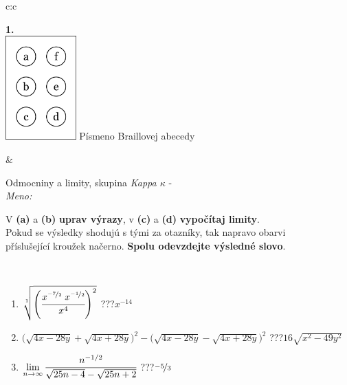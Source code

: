 \documentclass[10pt]{report}
\begin{document}
\begin{tabular}{c:c}
\begin{minipage}[c][104.5mm][t]{0.5\linewidth}
\begin{center}
\begin{minipage}{0.20\linewidth}
\begin{center}
{\Huge\bfseries 1.} \\[2mm]
\includegraphics[height=40mm]{../images/braille.png}
{\small Písmeno Braillovej abecedy}
\end{center}
\end{minipage}
\end{center}
\end{minipage}
&
\begin{minipage}[c][104.5mm][t]{0.5\linewidth}
\begin{center}
\vspace{7mm}
{\huge Odmocniny a limity, skupina \textit{Kappa $\kappa$} -}\\[5mm]
\textit{Meno:}\phantom{xxxxxxxxxxxxxxxxxxxxxxxxxxxxxxxxxxxxxxxxxxxxxxxxxxxxxxxxxxxxxxxxx}\\[5mm]
\begin{minipage}{0.95\linewidth}
\begin{center}
V \textbf{(a)} a \textbf{(b)} \textbf{uprav výrazy}, v \textbf{(c)} a \textbf{(d)} \textbf{vypočítaj limity}.\\Pokud se výsledky shodujú s tými za otazníky, tak napravo obarvi\\příslušející kroužek načerno. \textbf{Spolu odevzdejte výsledné slovo}.
\end{center}
\end{minipage}
\\[1mm]
\begin{minipage}{0.79\linewidth}
\begin{center}
\begin{varwidth}{\linewidth}
\begin{enumerate}
\small
\item $\sqrt[1]{\left(\cfrac{x^{\nicefrac{-7}{2}}\;x^{\nicefrac{-1}{2}}}{x^{4}}\right)^{2}}$\quad \dotfill\; ???\;\dotfill \quad $x^{-14}$
\item {\footnotesize{\scriptsize$\big(\sqrt{4x-28y}+\sqrt{4x+28y}\big)^2-\big(\sqrt{4x-28y}-\sqrt{4x+28y}\big)^2$}\quad \dotfill\; ???\;\dotfill \quad $16\sqrt{x^2-49y^2}$}
\item $\lim\limits_{n\to\infty}\cfrac{n^{-1/2}}{\sqrt{25n-4}-\sqrt{25n+2}}$\quad \dotfill\; ???\;\dotfill \quad $\nicefrac{-5}{3}$

\end{enumerate}
\end{varwidth}
\end{center}
\end{minipage}
\end{center}
\end{minipage}
\end{tabular}
\end{document}
